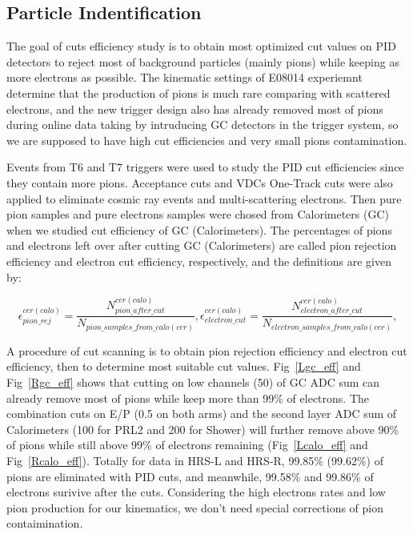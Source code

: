 \subsection{Particle Indentification}
 
 The goal of cuts efficiency study is to obtain most optimized cut values on PID detectors to reject most of background particles (mainly pions) while keeping as more electrons as possible. The kinematic settings of E08014 experiemnt determine that the production of pions is much rare comparing with scattered electrons, and the new trigger design also has already removed most of pions during online data taking by intruducing GC detectors in the trigger system, so we are supposed to have high cut efficiencies and very small pions contamination. 
 
 Events from T6 and T7 triggers were used to study the PID cut efficiencies since they contain more pions. Acceptance cuts and VDCs One-Track cuts were also applied to eliminate cosmic ray events and multi-scattering electrons. Then pure pion samples and pure electrons samples were chosed from Calorimeters (GC) when we studied cut efficiency of GC (Calorimeters). The percentages of pions and electrons left over after cutting GC (Calorimeters) are called pion rejection efficiency and electron cut efficiency, respectively, and the definitions are given by:

\begin{equation}
 \epsilon_{pion\_rej}^{cer(calo)} = \frac{N_{pion\_after\_cut}^{cer(calo)}}{N_{pion\_samples\_from\_calo(cer)}},  \epsilon_{electron\_cut}^{cer(calo)} = \frac{N_{electron\_after\_cut}^{cer(calo)}}{N_{electron\_samples\_from\_calo(cer)}},     
    \end{equation}


 A procedure of cut scanning is to obtain pion rejection efficiency and electron cut efficiency, then to determine most suitable cut values. Fig~\ref{Lgc_eff} and Fig~\ref{Rgc_eff} shows that cutting on low channels (50) of GC ADC sum can already remove most of pions while keep more than 99\% of electrons. The combination  cuts on E/P (0.5 on both arms) and the second layer ADC sum of Calorimeters (100 for PRL2 and 200 for Shower) will further remove above 90\% of pions while still above 99\% of electrons remaining (Fig~\ref{Lcalo_eff} and Fig~\ref{Rcalo_eff}). Totally for data in HRS-L and HRS-R, 99.85\% (99.62\%) of pions are eliminated with PID cuts, and meanwhile, 99.58\% and 99.86\% of electrons surivive after the cuts. Considering the high electrons rates and low pion production for our kinematics, we don't need special corrections of pion contaimination.

